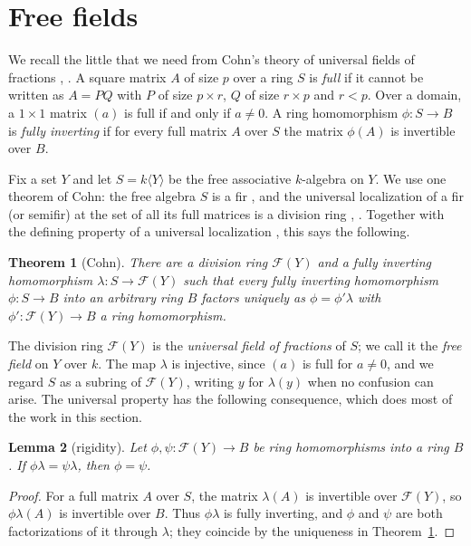 \documentclass[11pt]{amsart}
\theoremstyle{plain}
\newtheorem{theorem}{Theorem}[section]
\newtheorem{lemma}[theorem]{Lemma}
\theoremstyle{definition}
\theoremstyle{remark}
\newcommand{\free}[1]{k\langle #1\rangle}
\newcommand{\ff}[1]{\mathcal F(#1)}
\begin{document}
\section{Free fields}\label{sec:freefield}

We recall the little that we need from Cohn's theory of universal fields of fractions \cite[Chapter~4 and \S5.4]{CohSF}, \cite[Chapter~7]{CohFIR}. A square matrix $A$ of size $p$ over a ring $S$ is \emph{full} if it cannot be written as $A=PQ$ with $P$ of size $p\times r$, $Q$ of size $r\times p$ and $r<p$. Over a domain, a $1\times1$ matrix $(a)$ is full if and only if $a\ne0$. A ring homomorphism $\phi\colon S\to B$ is \emph{fully inverting} if for every full matrix $A$ over $S$ the matrix $\phi(A)$ is invertible over $B$.

Fix a set $Y$ and let $S=\free Y$ be the free associative $k$-algebra on $Y$. We use one theorem of Cohn: the free algebra $S$ is a fir \cite[Corollary~2.5.2]{CohFIR}, and the universal localization of a fir (or semifir) at the set of all its full matrices is a division ring \cite[Theorem~4.5.8, Corollary~4.5.9]{CohSF}, \cite[Theorem~7.5.13]{CohFIR}. Together with the defining property of a universal localization \cite[\S4.1]{CohSF}, this says the following.

\begin{theorem}[Cohn]\label{thm:cohn}
There are a division ring $\ff Y$ and a fully inverting homomorphism $\lambda\colon S\to\ff Y$ such that every fully inverting homomorphism $\phi\colon S\to B$ into an arbitrary ring $B$ factors uniquely as $\phi=\phi'\lambda$ with $\phi'\colon\ff Y\to B$ a ring homomorphism.
\end{theorem}

The division ring $\ff Y$ is the \emph{universal field of fractions} of $S$; we call it the \emph{free field} on $Y$ over $k$. The map $\lambda$ is injective, since $(a)$ is full for $a\ne0$, and we regard $S$ as a subring of $\ff Y$, writing $y$ for $\lambda(y)$ when no confusion can arise. The universal property has the following consequence, which does most of the work in this section.

\begin{lemma}[rigidity]\label{lem:rigid}
Let $\phi,\psi\colon\ff Y\to B$ be ring homomorphisms into a ring $B$. If $\phi\lambda=\psi\lambda$, then $\phi=\psi$.
\end{lemma}

\begin{proof}
For a full matrix $A$ over $S$, the matrix $\lambda(A)$ is invertible over $\ff Y$, so $\phi\lambda(A)$ is invertible over $B$. Thus $\phi\lambda$ is fully inverting, and $\phi$ and $\psi$ are both factorizations of it through $\lambda$; they coincide by the uniqueness in Theorem~\ref{thm:cohn}.
\end{proof}
\end{document}
